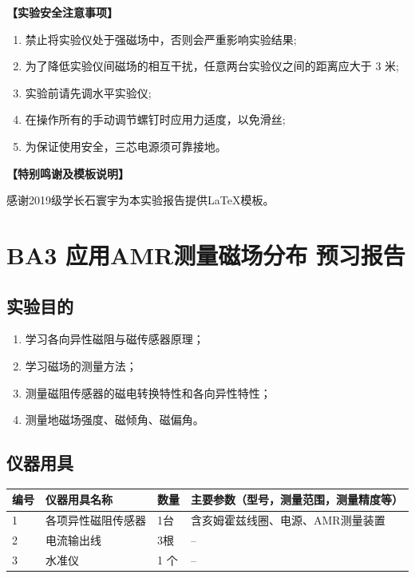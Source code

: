 \documentclass[dvipsnames, svgnames,a4paper,11pt]{article}
\begin{document}
	\textbf{【实验安全注意事项】}	
	\begin{enumerate}
		\item 禁止将实验仪处于强磁场中，否则会严重影响实验结果;
		\item 为了降低实验仪间磁场的相互干扰，任意两台实验仪之间的距离应大于 3 米;
		\item 实验前请先调水平实验仪; 
		\item 在操作所有的手动调节螺钉时应用力适度，以免滑丝; 
		\item 为保证使用安全，三芯电源须可靠接地。		
	\end{enumerate}
	
	\textbf{【特别鸣谢及模板说明】}	
	
	感谢2019级学长石寰宇为本实验报告提供\LaTeX 模板。
	
	
	
	\clearpage
	\tableofcontents
	\clearpage
	
	
	
	\setcounter{section}{0}
	\section{BA3 应用AMR测量磁场分布 \quad\heiti 预习报告}
	
	\subsection{实验目的}
	\begin{enumerate}
		\item 学习各向异性磁阻与磁传感器原理；
		\item 学习磁场的测量方法；
		\item 测量磁阻传感器的磁电转换特性和各向异性特性；
		\item 测量地磁场强度、磁倾角、磁偏角。
	\end{enumerate}
	
	\subsection{仪器用具}
	\begin{table}[htbp]
		\centering
		\renewcommand\arraystretch{1.6}
		\begin{tabular}{p{}|p{}|p{}|p{}}
			\hline
			编号& 仪器用具名称 & 数量 &  主要参数（型号，测量范围，测量精度等） \\
			\hline
			1& 各项异性磁阻传感器 & 1台 & 含亥姆霍兹线圈、电源、AMR测量装置 \\
			
			2& 电流输出线 & 3根 & -- \\
			
			3& 水准仪 & 1 个 & -- \\
			\hline
		\end{tabular}
	\end{table}
	
\end{document}
